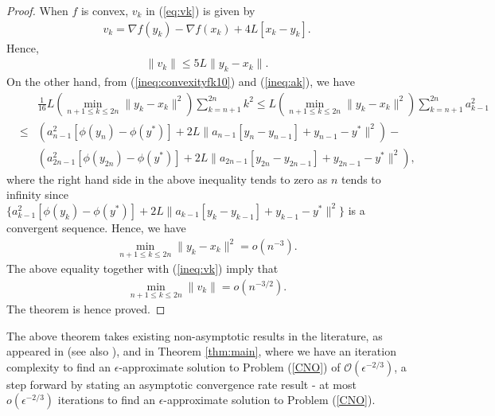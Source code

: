\documentclass[11pt]{article}
\begin{document}
\begin{proof}
When $f$ is convex, $v_k$ in (\ref{eq:vk}) is given by
\begin{eqnarray*}
v_k = \nabla f(y_k) - \nabla f(x_k) + 4L[x_k - y_k].
\end{eqnarray*}
Hence,
\begin{eqnarray}\label{ineq:vk}
\| v_k \| \leq 5L \| y_k - x_k \|.
\end{eqnarray}
On the other hand, from (\ref{ineq:convexityfk10}) and (\ref{ineq:ak}), we have
\begin{eqnarray*}
&    & \frac{1}{16}L \left( \min_{n+1 \leq k \leq 2n}  \| y_k - x_k \|^2  \right) \sum_{k=n+1}^{2n} k^2 \leq  L \left( \min_{n+1 \leq k \leq 2n}  \| y_k - x_k \|^2  \right) \sum_{k=n+1}^{2n} a_{k-1}^2 \\
& \leq   & (a_{n-1}^2[\phi(y_{n}) - \phi(y^\ast)] + 2L\| a_{n-1}[y_{n} - y_{n-1}] + y_{n-1} - y^\ast \|^2) - \\
& &  (a_{2n - 1}^2 [ \phi(y_{2n}) - \phi(y^\ast)] + 2L\| a_{2n -1}[y_{2n} - y_{2n - 1}] + y_{2n - 1} - y^\ast \|^2),
\end{eqnarray*}
where the right hand side in the above inequality tends to zero as $n$ tends to infinity since $\{a_{k-1}^2[\phi(y_k) - \phi(y^\ast)] + 2L \|a_{k-1}[y_k - y_{k-1}] + y_{k-1} - y^\ast \|^2 \}$ is a convergent sequence.  Hence, we have
\begin{eqnarray*}
\min_{n+1 \leq k \leq 2n}  \| y_k - x_k \|^2  = o(n^{-3}).
\end{eqnarray*}
The above equality together with (\ref{ineq:vk}) imply that
\begin{eqnarray*}
\min_{n + 1 \leq k \leq 2n} \| v_k \| = o(n^{-3/2}).
\end{eqnarray*}
The theorem is hence proved.
\end{proof}

\vspace{10pt}

\noindent The above theorem takes existing non-asymptotic results in the literature, as appeared in \cite{Ghadimi,Liang3} (see also \cite{Shi}), and in Theorem \ref{thm:main}, where we have an iteration complexity to find an $\epsilon$-approximate solution to Problem (\ref{CNO}) of $\mathcal{O}(\epsilon^{-2/3})$, a step forward by stating an asymptotic convergence rate result - at most $o(\epsilon^{-2/3})$ iterations to find an $\epsilon$-approximate solution to Problem (\ref{CNO}).  

\vspace{10pt}
\end{document}
